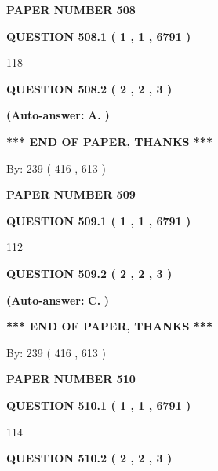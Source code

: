 \documentclass[12pt]{article}
\begin{document}
   
\newpage 
\setcounter{page}{ 
   508001 } 
   
   
 {\textbf{ \Large{ PAPER NUMBER  508  }}}
   
   
   
   
  
  
{\textbf{\large{QUESTION
508.1 
 ( 1 , 1 , 6791 )
}}}

118
  
  
{\textbf{\large{QUESTION
508.2 
 ( 2 , 2 , 3 )
}}}
 
 
{\textbf{(Auto-answer:}}
{\textbf{\large{
A.}}}
{\textbf{)}}
 
 
   
   
   
   
\vspace{1.0in} 
{\textbf{\large{ *** END OF PAPER, THANKS *** }}} 
   
   
\hspace{1.0in} By: 
 239 ( 416 ,  613 )
   
   
   
   
\newpage 
\setcounter{page}{ 
   509001 } 
   
   
 {\textbf{ \Large{ PAPER NUMBER  509  }}}
   
   
   
   
  
  
{\textbf{\large{QUESTION
509.1 
 ( 1 , 1 , 6791 )
}}}

112
  
  
{\textbf{\large{QUESTION
509.2 
 ( 2 , 2 , 3 )
}}}
 
 
{\textbf{(Auto-answer:}}
{\textbf{\large{
C.}}}
{\textbf{)}}
 
 
   
   
   
   
\vspace{1.0in} 
{\textbf{\large{ *** END OF PAPER, THANKS *** }}} 
   
   
\hspace{1.0in} By: 
 239 ( 416 ,  613 )
   
   
   
   
\newpage 
\setcounter{page}{ 
   510001 } 
   
   
 {\textbf{ \Large{ PAPER NUMBER  510  }}}
   
   
   
   
  
  
{\textbf{\large{QUESTION
510.1 
 ( 1 , 1 , 6791 )
}}}

114
  
  
{\textbf{\large{QUESTION
510.2 
 ( 2 , 2 , 3 )
}}}
 
\end{document}
